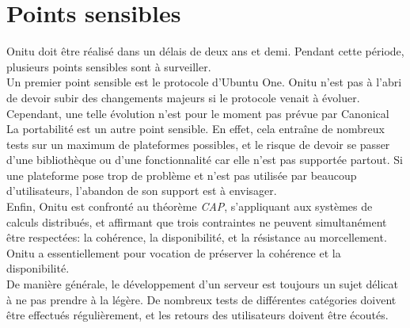 \section{Points sensibles}
Onitu doit être réalisé dans un délais de deux ans et demi. Pendant cette période, plusieurs points sensibles sont à surveiller.\\

Un premier point sensible est le protocole d'Ubuntu One. Onitu n'est pas à l'abri de devoir subir des changements majeurs si le protocole venait à évoluer. Cependant, une telle évolution n'est pour le moment pas prévue par Canonical\\

La portabilité est un autre point sensible. En effet, cela entraîne de nombreux tests sur un maximum de plateformes possibles, et le risque de devoir se passer d'une bibliothèque ou d'une fonctionnalité car elle n'est pas supportée partout. Si une plateforme pose trop de problème et n'est pas utilisée par beaucoup d'utilisateurs, l'abandon de son support est à envisager.\\

Enfin, Onitu est confronté au théorème \textit{CAP}, s'appliquant aux systèmes de calculs distribués, et affirmant que trois contraintes ne peuvent simultanément être respectées: la cohérence, la disponibilité, et la résistance au morcellement. Onitu a essentiellement pour vocation de préserver la cohérence et la disponibilité.\\

De manière générale, le développement d'un serveur est toujours un sujet délicat à ne pas prendre à la légère. De nombreux tests de différentes catégories doivent être effectués régulièrement, et les retours des utilisateurs doivent être écoutés.